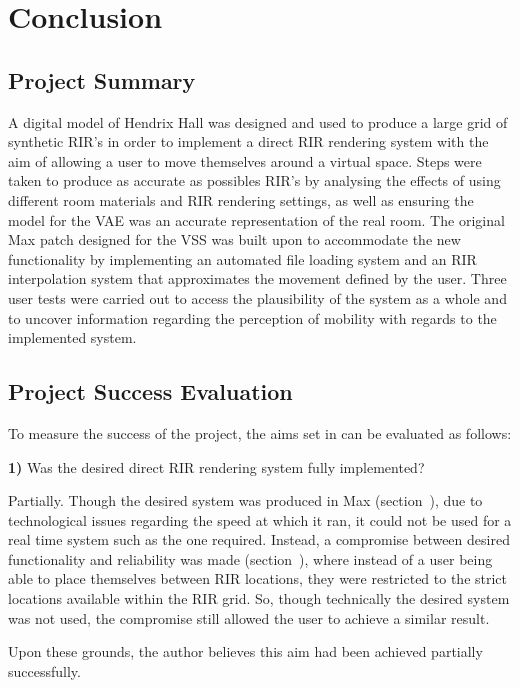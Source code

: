 \documentclass[../../main.tex]{subfiles}
\begin{document}
	\section{Conclusion}
	
		\subsection{Project Summary}
		A digital model of Hendrix Hall was designed and used to produce a large grid of synthetic \ac{RIR}'s in order to implement a direct \ac{RIR} rendering system with the aim of allowing a user to move themselves around a virtual space. Steps were taken to produce as accurate as possibles \ac{RIR}'s by analysing the effects of using different room materials and \ac{RIR} rendering settings, as well as ensuring the model for the \ac{VAE} was an accurate representation of the real room. The original Max patch designed for the \ac{VSS} was built upon to accommodate the new functionality by implementing an automated file loading system and an \ac{RIR} interpolation system that approximates the movement defined by the user. Three user tests were carried out to access the plausibility of the system as a whole and to uncover information regarding the perception of mobility with regards to the implemented system. 


		\subsection{Project Success Evaluation}

			To measure the success of the project, the aims set in  can be evaluated as follows:

			\textbf{1)} Was the desired direct \ac{RIR} rendering system fully implemented?

				Partially. Though the desired system was produced in Max (section~), due to technological issues regarding the speed at which it ran, it could not be used for a real time system such as the one required. Instead, a compromise between desired functionality and reliability was made (section~), where instead of a user being able to place themselves between \ac{RIR} locations, they were restricted to the strict locations available within the \ac{RIR} grid. So, though technically the desired system was not used, the compromise still allowed the user to achieve a similar result.

				Upon these grounds, the author believes this aim had been achieved partially successfully.
\end{document}
